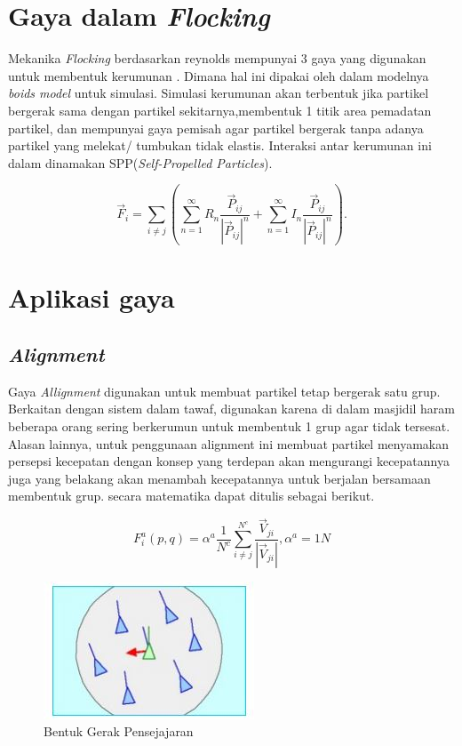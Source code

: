 \section{Gaya dalam \emph{Flocking}}\label{sec:flocking}

Mekanika \emph{Flocking} berdasarkan reynolds mempunyai 3 gaya yang digunakan untuk membentuk kerumunan   \citep{Reynolds1987} \citep{Nasir2016}. Dimana hal ini dipakai oleh \citep{Chate2008} dalam modelnya \emph{boids model} untuk simulasi. Simulasi kerumunan akan terbentuk jika partikel bergerak sama dengan partikel sekitarnya,membentuk 1 titik area pemadatan partikel, dan mempunyai gaya pemisah agar partikel bergerak tanpa adanya partikel yang melekat/ tumbukan tidak elastis. Interaksi antar kerumunan ini dalam \citep{Chate2008} dinamakan SPP(\emph{Self-Propelled Particles}). 

\begin{equation}
\vec{F}_i = \sum_{i \neq j} (\sum_{n=1}^{\infty} R_{n} \dfrac{\vec{P}_{ij}}{|\vec{P}_{ij}|^n}  + \sum_{n=1}^{\infty} I_{n} \dfrac{\vec{P}_{ij}}{|\vec{P}_{ij}|^n}). 
\end{equation}

\section{Aplikasi gaya}\label{cha:aplikasi gaya}

\subsection{\emph{Alignment}}\label{sec:alignment}
\hspace {0.5cm} Gaya \emph{Allignment} digunakan untuk membuat partikel tetap bergerak satu grup. Berkaitan dengan sistem dalam tawaf, digunakan karena di dalam masjidil haram beberapa orang sering berkerumun untuk membentuk 1 grup agar tidak tersesat. Alasan lainnya, untuk penggunaan alignment ini membuat partikel menyamakan persepsi kecepatan dengan konsep yang terdepan akan mengurangi kecepatannya juga yang belakang akan menambah kecepatannya untuk berjalan bersamaan membentuk grup\citep{Reynolds1987}. secara matematika dapat ditulis sebagai berikut.

\begin{equation}
 F_i^a(p,q) = \alpha^a \dfrac{1}{N^c}\sum^{N^c}_{i \neq j}\dfrac{\vec{V}_{ji}}{|\vec{V}_{ji}|},\alpha^a = 1N
\end{equation}


\begin{figure}
\centering
\includegraphics[scale=0.5]{gambar/allignment}
\caption{Bentuk Gerak Pensejajaran\citep{Reynolds1987}}
\end{figure}

